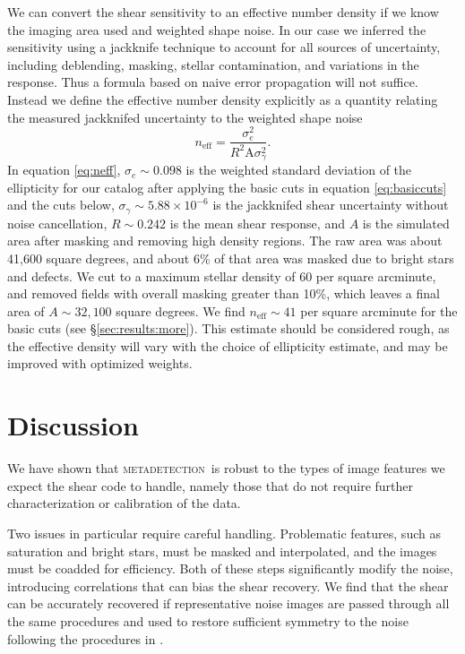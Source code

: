 \documentclass[twocolumn,twocolappendix,astrosym]{openjournal}
\newcommand{\mdet}{\textsc{metadetection}}
\begin{document}
We can convert the shear sensitivity to an effective number density if we know
the imaging area used and weighted shape noise.  In our case we inferred the
sensitivity using a jackknife technique to account for all sources of
uncertainty, including deblending, masking, stellar contamination, and
variations in the response.  Thus a formula based on naive error propagation
will not suffice.  Instead we define the effective number density explicitly as
a quantity relating the measured jackknifed uncertainty to the weighted shape
noise
\begin{equation} \label{eq:neff}
    n_{\mathrm{eff}} = \frac{\sigma^2_{e}}{R^2 \mathrm{A} \sigma^2_{\gamma}}.
\end{equation}
In equation \ref{eq:neff}, $\sigma_e \sim 0.098$ is the weighted standard
deviation of the ellipticity for our catalog after applying the basic cuts in
equation \ref{eq:basiccuts} and the cuts below, $\sigma_\gamma \sim 5.88 \times
10^{-6}$ is the jackknifed shear uncertainty without noise cancellation, $R
\sim 0.242$ is the mean shear response, and $A$ is the simulated area after
masking and removing high density regions.    The raw area was about 41,600
square degrees, and about 6\% of that area was masked due to bright stars and
defects.  We cut to a maximum stellar density of 60 per square arcminute, and
removed fields with overall masking greater than 10\%, which leaves a final
area of $A \sim 32,100$ square degrees.  We find $n_\mathrm{eff} \sim 41$ per
square arcminute for the basic cuts (see \S \ref{sec:results:more}).  This
estimate should be considered rough, as the effective density will vary with
the choice of ellipticity estimate, and may be improved with optimized weights.

\section{Discussion} \label{sec:summary}

We have shown that \mdet\ is robust to the types of image features we expect
the shear code to handle, namely those that do not require further
characterization or calibration of the data.

Two issues in particular require careful handling.  Problematic features, such
as saturation and bright stars, must be masked and interpolated, and the images
must be coadded for efficiency. Both of these steps significantly modify the
noise, introducing correlations that can bias the shear recovery.  We find that
the shear can be accurately recovered if representative noise images are passed
through all the same procedures and used to restore sufficient symmetry to the
noise following the procedures in \cite{SheldonMcal2017}.
\end{document}
